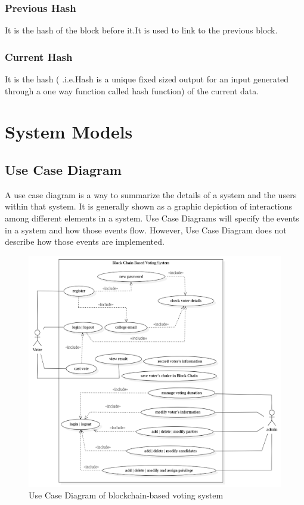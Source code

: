 \subsubsection{Previous Hash}
It is the hash of the block before it.It is used to link to the previous block.

\subsubsection{Current Hash}
It is the hash ( .i.e.Hash is a unique fixed sized output for an input generated through a one way function called hash function) of the current data.

\section{System Models}
\subsection{Use Case Diagram}
A use case diagram is a way to summarize the details of a system and the users within that system. It is generally shown as a graphic depiction of interactions among different elements in a system. Use Case Diagrams will specify the events in a system and how those events flow. However, Use Case Diagram does not describe how those events are implemented.

\begin{figure}[H] %
\begin{center}
	\includegraphics[width = 5.5in]{images/usecaseDiagram.png}
	\caption{Use Case Diagram of blockchain-based voting system} %
	\label{figSample1} %
\end{center}
\end{figure}

